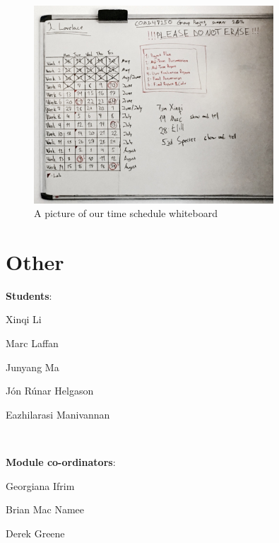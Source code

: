 \documentclass{article}
\begin{document}
\begin{figure}[H]
    \centering
    \includegraphics[width=0.8\textwidth]{whiteboard}    
    \caption{A picture of our time schedule whiteboard}
\end{figure}


\section*{Other}

\begin{samepage}
\begin{center}
\begin{minipage}[t]{.4\textwidth}
	\textbf{Students}:
		\begin{itemize*}
			\item Xinqi Li
			\item Marc Laffan
			\item Junyang Ma
			\item Jón Rúnar Helgason
			\item Eazhilarasi Manivannan
		\end{itemize*}
\end{minipage}
~
\begin{minipage}[t]{.4\textwidth}
	\textbf{Module co-ordinators}:
	\begin{itemize*}
		\item Georgiana Ifrim
		\item Brian Mac Namee
		\item Derek Greene
	\end{itemize*}
\end{minipage}
\end{center}
\end{samepage}
\end{document}
